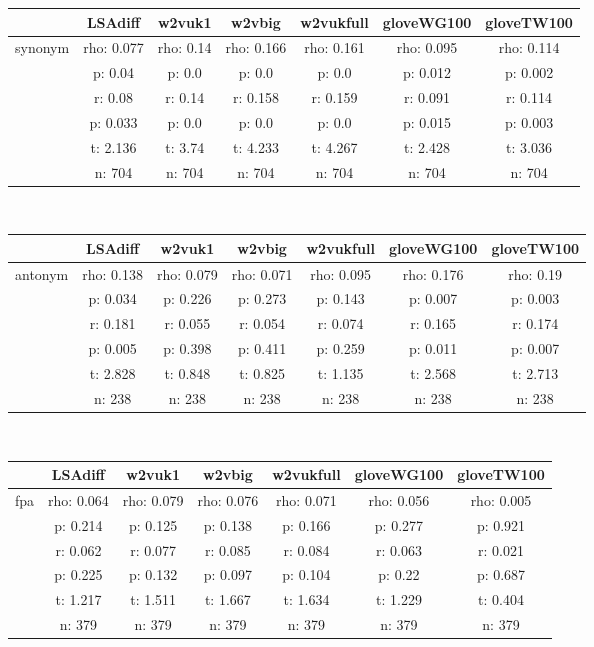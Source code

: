 \documentclass{article}
\begin{document}
\begin{tabular}{ccccccc|}\cline{2-7}
&\multicolumn{1}{|c}{LSAdiff} & w2vuk1 & w2vbig & w2vukfull & gloveWG100 & gloveTW100 \\\hline
\multicolumn{1}{|c|}{\multirow{6}{*}{synonym}} & rho: 0.077 & rho: 0.14 & rho: 0.166 & rho: 0.161 & rho: 0.095 & rho: 0.114 \\
\multicolumn{1}{|c|}{} & p: 0.04 & p: 0.0 & p: 0.0 & p: 0.0 & p: 0.012 & p: 0.002 \\
\multicolumn{1}{|c|}{} & r: 0.08 & r: 0.14 & r: 0.158 & r: 0.159 & r: 0.091 & r: 0.114 \\
\multicolumn{1}{|c|}{} & p: 0.033 & p: 0.0 & p: 0.0 & p: 0.0 & p: 0.015 & p: 0.003 \\
\multicolumn{1}{|c|}{} & t: 2.136 & t: 3.74 & t: 4.233 & t: 4.267 & t: 2.428 & t: 3.036 \\
\multicolumn{1}{|c|}{} & n: 704 & n: 704 & n: 704 & n: 704 & n: 704 & n: 704 \\
\hline
\end{tabular}\\
\begin{tabular}{ccccccc|}\cline{2-7}
&\multicolumn{1}{|c}{LSAdiff} & w2vuk1 & w2vbig & w2vukfull & gloveWG100 & gloveTW100 \\\hline
\multicolumn{1}{|c|}{\multirow{6}{*}{antonym}} & rho: 0.138 & rho: 0.079 & rho: 0.071 & rho: 0.095 & rho: 0.176 & rho: 0.19 \\
\multicolumn{1}{|c|}{} & p: 0.034 & p: 0.226 & p: 0.273 & p: 0.143 & p: 0.007 & p: 0.003 \\
\multicolumn{1}{|c|}{} & r: 0.181 & r: 0.055 & r: 0.054 & r: 0.074 & r: 0.165 & r: 0.174 \\
\multicolumn{1}{|c|}{} & p: 0.005 & p: 0.398 & p: 0.411 & p: 0.259 & p: 0.011 & p: 0.007 \\
\multicolumn{1}{|c|}{} & t: 2.828 & t: 0.848 & t: 0.825 & t: 1.135 & t: 2.568 & t: 2.713 \\
\multicolumn{1}{|c|}{} & n: 238 & n: 238 & n: 238 & n: 238 & n: 238 & n: 238 \\
\hline
\end{tabular}\\
\begin{tabular}{ccccccc|}\cline{2-7}
&\multicolumn{1}{|c}{LSAdiff} & w2vuk1 & w2vbig & w2vukfull & gloveWG100 & gloveTW100 \\\hline
\multicolumn{1}{|c|}{\multirow{6}{*}{fpa}} & rho: 0.064 & rho: 0.079 & rho: 0.076 & rho: 0.071 & rho: 0.056 & rho: 0.005 \\
\multicolumn{1}{|c|}{} & p: 0.214 & p: 0.125 & p: 0.138 & p: 0.166 & p: 0.277 & p: 0.921 \\
\multicolumn{1}{|c|}{} & r: 0.062 & r: 0.077 & r: 0.085 & r: 0.084 & r: 0.063 & r: 0.021 \\
\multicolumn{1}{|c|}{} & p: 0.225 & p: 0.132 & p: 0.097 & p: 0.104 & p: 0.22 & p: 0.687 \\
\multicolumn{1}{|c|}{} & t: 1.217 & t: 1.511 & t: 1.667 & t: 1.634 & t: 1.229 & t: 0.404 \\
\multicolumn{1}{|c|}{} & n: 379 & n: 379 & n: 379 & n: 379 & n: 379 & n: 379 \\
\hline
\end{tabular}\\
\end{document}
